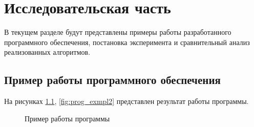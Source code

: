 \chapter{Исследовательская часть}
В текущем разделе будут представлены примеры работы разработанного программного обеспечения, постановка эксперимента и сравнительный анализ реализованных алгоритмов.

\section{Пример работы программного обеспечения}

На рисунках \ref{fig:prog_exmpl1}, \ref{fig:prog_exmpl2} представлен результат работы программы.

\begin{figure}[h!]
	
	
	\caption{Пример работы программы}
	
	\label{fig:prog_exmpl1}
	
\end{figure}

